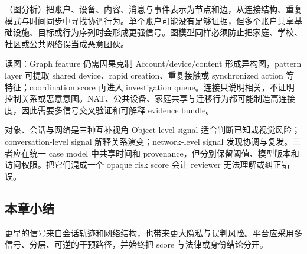 （图分析）把账户、设备、内容、消息与事件表示为节点和边，从连接结构、重复模式与时间同步中寻找协调行为。单个账户可能没有足够证据，但多个账户共享基础设施、目标或行为序列时会形成更强信号。图模型同样必须防止把家庭、学校、社区或公共网络误当成恶意团伙。


\begin{knowledgebox}{读图：Graph feature 仍需因果克制}
Account/device/content 形成异构图，pattern layer 可提取 shared device、rapid creation、重复接触或 synchronized action 等特征；coordination score 再进入 investigation queue。连接只说明相关，不证明控制关系或恶意意图。NAT、公共设备、家庭共享与迁移行为都可能制造高连接度，因此需要多信号交叉验证和可解释 evidence bundle。
\end{knowledgebox}

\begin{importantbox}{对象、会话与网络是三种互补视角}
Object-level signal 适合判断已知或视觉风险；conversation-level signal 解释关系演变；network-level signal 发现协调与复发。三者应在统一 case model 中共享时间和 provenance，但分别保留阈值、模型版本和访问权限。把它们混成一个 opaque risk score 会让 reviewer 无法理解或纠正错误。
\end{importantbox}

\subsection{本章小结}

更早的信号来自会话轨迹和网络结构，也带来更大隐私与误判风险。平台应采用多信号、分层、可逆的干预路径，并始终把 score 与法律或身份结论分开。

